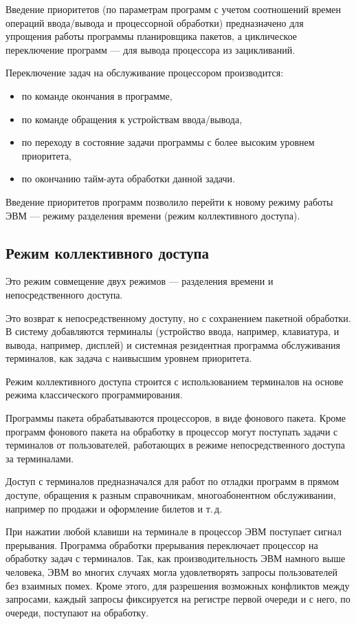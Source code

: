 \documentclass[a5paper, 10pt, notitlepage, pdftex,headsepline]{scrartcl}
\begin{document}
    Введение приоритетов (по параметрам программ с учетом соотношений
    времен операций ввода/вывода и процессорной обработки) предназначено
    для упрощения работы программы планировщика пакетов, а циклическое
    переключение программ --- для вывода процессора из зацикливаний.

    Переключение задач на обслуживание процессором производится:
    \begin{itemize}
      \item по команде окончания в программе,
      \item по команде обращения к устройствам ввода/вывода,
      \item по переходу в состояние задачи программы с более высоким
        уровнем приоритета,
      \item по окончанию тайм-аута обработки данной задачи.
    \end{itemize}

    Введение приоритетов программ позволило перейти к новому режиму
    работы ЭВМ --- режиму разделения времени (режим коллективного
    доступа).
  \subsection{Режим коллективного доступа}
    Это режим совмещение двух режимов --- разделения времени и
    непосредственного доступа.

    Это возврат к непосредственному доступу, но с сохранением пакетной
    обработки.
    В систему добавляются терминалы (устройство ввода, например,
    клавиатура, и вывода, например, дисплей) и системная резидентная
    программа обслуживания терминалов, как задача с наивысшим уровнем
    приоритета.

    Режим коллективного доступа строится с использованием терминалов на
    основе режима классического программирования.

    Программы пакета обрабатываются процессоров, в виде фонового пакета.
    Кроме программ фонового пакета на обработку в процессор могут
    поступать задачи с терминалов от пользователей, работающих в режиме
    непосредственного доступа за терминалами.

    Доступ с терминалов предназначался для работ по отладки программ в
    прямом доступе, обращения к разным справочникам, многоабонентном
    обслуживании, например по продажи и оформление билетов и т.\,д.

    При нажатии любой клавиши на терминале в процессор ЭВМ поступает
    сигнал прерывания.
    Программа обработки прерывания переключает процессор на обработку
    задач с терминалов.
    Так, как производительность ЭВМ намного выше человека, ЭВМ во многих
    случаях могла удовлетворять запросы пользователей без взаимных помех.
    Кроме этого, для разрешения возможных конфликтов между запросами,
    каждый запросы фиксируется на регистре первой очереди и с него, по
    очереди, поступают на обработку.
\end{document}
